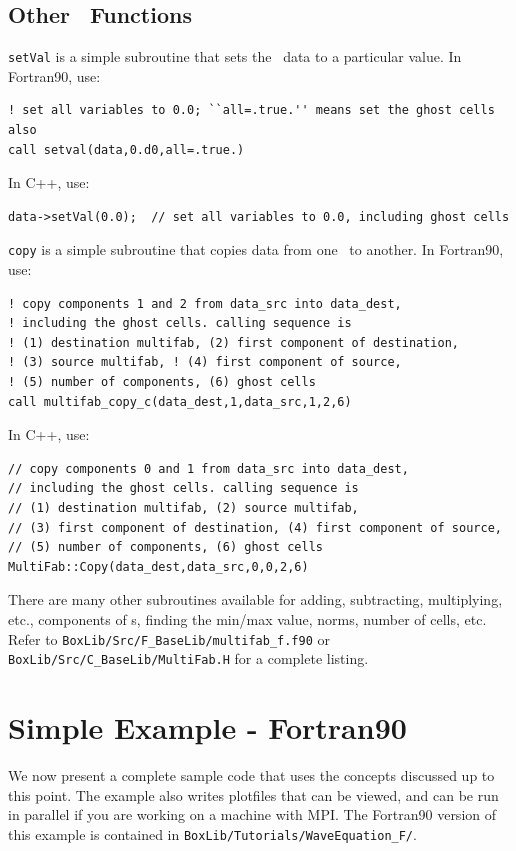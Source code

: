\subsection{Other \MultiFab\ Functions}
{\tt setVal} is a simple subroutine that sets the \MultiFab\ data to a particular value.
In Fortran90, use:
\begin{lstlisting}[language={[gnu]make},mathescape=false]
! set all variables to 0.0; ``all=.true.'' means set the ghost cells also
call setval(data,0.d0,all=.true.)
\end{lstlisting}
In C++, use:
\begin{lstlisting}[language={[gnu]make},mathescape=false]
data->setVal(0.0);  // set all variables to 0.0, including ghost cells
\end{lstlisting}
{\tt copy} is a simple subroutine that copies data from one \MultiFab\ to another.
In Fortran90, use:
\begin{lstlisting}[language={[gnu]make},mathescape=false]
! copy components 1 and 2 from data_src into data_dest, 
! including the ghost cells. calling sequence is 
! (1) destination multifab, (2) first component of destination, 
! (3) source multifab, ! (4) first component of source, 
! (5) number of components, (6) ghost cells
call multifab_copy_c(data_dest,1,data_src,1,2,6)
\end{lstlisting}
In C++, use:
\begin{lstlisting}[language={[gnu]make},mathescape=false]
// copy components 0 and 1 from data_src into data_dest, 
// including the ghost cells. calling sequence is 
// (1) destination multifab, (2) source multifab, 
// (3) first component of destination, (4) first component of source, 
// (5) number of components, (6) ghost cells
MultiFab::Copy(data_dest,data_src,0,0,2,6)
\end{lstlisting}
There are many other subroutines available for adding, subtracting, multiplying, etc.,
components of \MultiFab s, finding the min/max value, norms, number of cells, etc.
Refer to {\tt BoxLib/Src/F\_BaseLib/multifab\_f.f90} or 
{\tt BoxLib/Src/C\_BaseLib/MultiFab.H} for a complete listing.

\section{Simple Example - Fortran90}
We now present a complete sample code that uses the concepts discussed up to this point.
The example also writes plotfiles that can be viewed, and can be run in parallel if you
are working on a machine with MPI.  The Fortran90 version of this example is contained in 
{\tt BoxLib/Tutorials/WaveEquation\_F/}.

